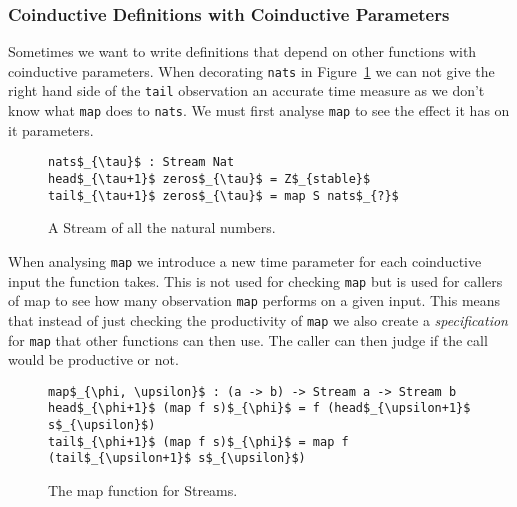 \subsubsection{Coinductive Definitions with Coinductive Parameters}

Sometimes we want to write definitions that depend on other functions with coinductive parameters. When decorating \texttt{nats} in Figure~\ref{fig:nats_productivity} we can not give the right hand side of the \texttt{tail} observation an accurate time measure as we don't know what \texttt{map} does to \texttt{nats}. We must first analyse \texttt{map} to see the effect it has on it parameters.

\begin{figure}
\begin{Verbatim}[commandchars=\\\{\},codes={\catcode`$=3\catcode`_=8}]
nats$_{\tau}$ : Stream Nat
head$_{\tau+1}$ zeros$_{\tau}$ = Z$_{stable}$
tail$_{\tau+1}$ zeros$_{\tau}$ = map S nats$_{?}$
\end{Verbatim}
\caption{A Stream of all the natural numbers.}
\label{fig:nats_productivity}
\end{figure}

When analysing \texttt{map} we introduce a new time parameter for each coinductive input the function takes. This is not used for checking \texttt{map} but is used for callers of map to see how many observation \texttt{map} performs on a given input. This means that instead of just checking the productivity of \texttt{map} we also create a \textit{specification} for \texttt{map} that other functions can then use. The caller can then judge if the call would be productive or not.

\begin{figure}
\begin{Verbatim}[commandchars=\\\{\},codes={\catcode`$=3\catcode`_=8}]
map$_{\phi, \upsilon}$ : (a -> b) -> Stream a -> Stream b
head$_{\phi+1}$ (map f s)$_{\phi}$ = f (head$_{\upsilon+1}$ s$_{\upsilon}$)
tail$_{\phi+1}$ (map f s)$_{\phi}$ = map f (tail$_{\upsilon+1}$ s$_{\upsilon}$)
\end{Verbatim}
\caption{The map function for Streams.}
\label{fig:map}
\end{figure}

